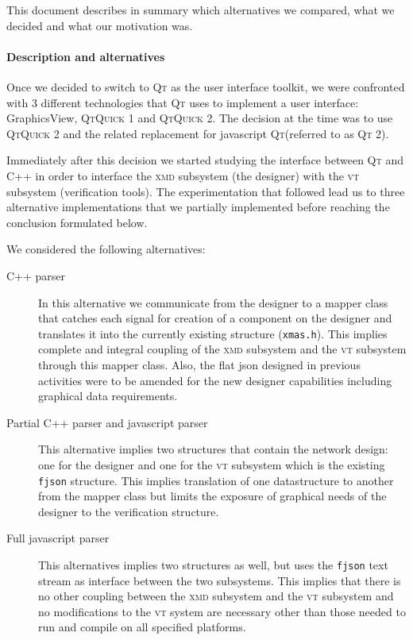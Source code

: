 \documentclass[a4paper,11pt,final]{article}
\newcommand{\w}[1]{\texttt{#1}\xspace}
\newcommand{\xmd}{\textsc{xmd}\xspace}%
\newcommand{\vt}{\textsc{vt}\xspace}%
\newcommand{\qt}{\textsc{Qt}\xspace}%
\newcommand{\qtquick}{\textsc{QtQuick}\xspace}%
\newcommand{\qml}{\textsc{Qt}\xspace}%
\newcommand{\cpp}{\textsc{C++}\xspace}%
\begin{document}
This document describes in summary which alternatives we compared, what
we decided and what our motivation was. 

\paragraph{Description and alternatives}
Once we decided to switch to \qt as the user interface toolkit, we were
confronted with 3 different technologies that \qt uses to
implement a user interface: GraphicsView, \qtquick1 and \qtquick2. The 
decision at the time was to use \qtquick2 and the related replacement
for javascript \qml (referred to as \qml2). 

Immediately after this decision we started studying the interface between 
\qml and \cpp in order to interface the \xmd subsystem (the designer) with
the \vt subsystem (verification tools). The experimentation that followed
lead us to three alternative implementations that we partially implemented
before reaching the conclusion formulated below.

We considered the following alternatives:

\begin{description}
	\item[\cpp parser] In this alternative we communicate from
	the designer to a mapper class that catches each signal for creation
	of a component on the designer and translates it into the currently
	existing structure (\w{xmas.h}). This implies complete and integral
	coupling of the \xmd subsystem and the \vt subsystem through this
	mapper class. Also, the flat json designed in previous activities were
	to be amended for the new designer capabilities including graphical
	data requirements.
	
	\item[Partial \cpp parser and javascript parser] This alternative
	implies two structures that contain the network design: one for
	the designer and one for the \vt subsystem which is the existing 
	\w{fjson} structure. This implies translation of one datastructure 
	to another from the mapper class but limits the exposure of graphical 
	needs of the designer to the verification structure.
	
	\item[Full javascript parser] This alternatives implies two structures
	as well, but uses the \w{fjson} text stream as interface between the
	two subsystems. This implies that there is no other coupling between
	the \xmd subsystem and the \vt subsystem and no modifications to the
	\vt system are necessary other than those needed to run and compile on
	all specified platforms. 
\end{description}
\end{document}
